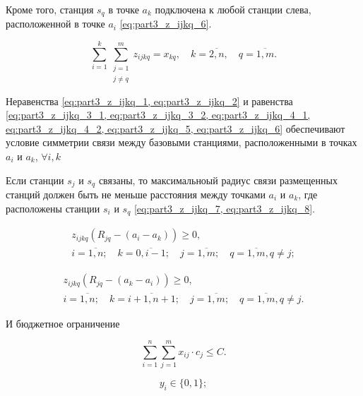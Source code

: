 Кроме того, станция $ s_q $ в точке $ a_k $ подключена к любой станции слева, расположенной в точке $ a_i $ \cref{eq:part3_z_ijkq_6}. 


\begin{equation}
  \label{eq:part3_z_ijkq_6}
  \sum\limits_{i=1}^{k} \sum\limits_{\substack{j=1 \\ j \neq q}}^m z_{ijkq} = x_{kq} , \quad k = \overline{2, n}, \quad q = \overline{1, m}.
\end{equation}

Неравенства \cref{eq:part3_z_ijkq_1, eq:part3_z_ijkq_2} и равенства \cref{eq:part3_z_ijkq_3_1, eq:part3_z_ijkq_3_2, eq:part3_z_ijkq_4_1, eq:part3_z_ijkq_4_2, eq:part3_z_ijkq_5, eq:part3_z_ijkq_6} обеспечивают условие симметрии связи между базовыми станциями, расположенными в точках $ a_i $ и $ a_k $, $\forall i, k $ 


Если станции $ s_j $ и $ s_q $ связаны, то максимальноый радиус связи размещенных станций должен быть не меньше расстояния между точками $ a_i $ и $ a_k $, где расположены станции $ s_i $ и $ s_q $ \cref{eq:part3_z_ijkq_7, eq:part3_z_ijkq_8}.

\begin{equation}
    \begin{gathered}
  \label{eq:part3_z_ijkq_7}
  z_{ijkq}(R_{jq}-(a_i-a_k ))\geq 0, \\i= \overline{1,n}; \quad k=\overline{0,i-1}; \quad j=\overline{1,m}; \quad q= \overline{1,m}, q \neq j; 
    \end{gathered}
\end{equation}

\begin{equation}
    \begin{gathered}
  \label{eq:part3_z_ijkq_8}
  z_{ijkq} (R_{jq}-(a_k-a_i )) \geq 0,  \\ i= \overline{1,n}; \quad k=\overline{i+1,n+1};  \quad j=\overline{1,m}; \quad q= \overline{1,m}, q \neq j.
    \end{gathered}
\end{equation}

И бюджетное ограничение

\begin{equation}
  \label{eq:part3_cost}
  \sum\limits_{i=1}^n \sum\limits_{j=1}^m x_{ij} \cdot c_j \leq C.
\end{equation}

\begin{equation}
    \label{eq:syn_ilp_y}
    y_i \in \{0, 1\};
\end{equation}

